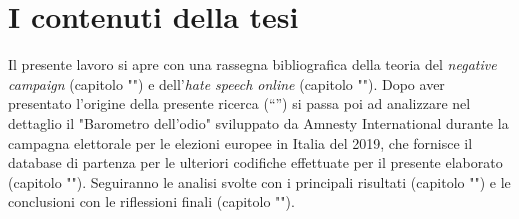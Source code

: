 \section{I contenuti della tesi}
Il presente lavoro si apre con una rassegna bibliografica della teoria del \textit{negative campaign} (capitolo "") e dell'\textit{hate speech online} (capitolo ""). Dopo aver presentato l'origine della presente ricerca (“”) si passa poi ad analizzare nel dettaglio il "Barometro dell'odio" sviluppato da Amnesty International durante la campagna elettorale per le elezioni europee in Italia del 2019, che fornisce il database di partenza per le ulteriori codifiche effettuate per il presente elaborato (capitolo ""). Seguiranno le analisi svolte con i principali risultati (capitolo "") e le conclusioni con le riflessioni finali (capitolo "").





